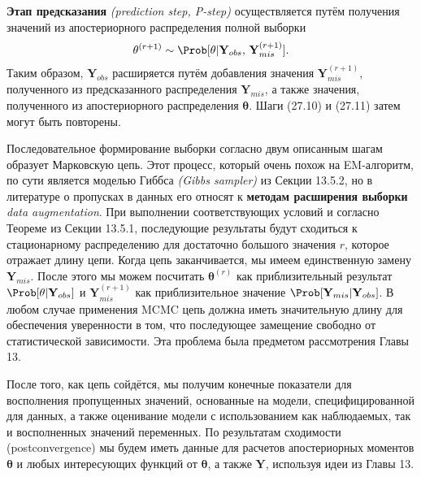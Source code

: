 {\bf Этап предсказания} \emph{(prediction step, P-step)} осуществляется путём получения значений из апостериорного распределения полной выборки
\begin{equation}
\mathbf{\theta}^{(r+1)} \sim \Prob[\mathbf{\theta}|\mathbf{Y}_{obs}, \, \mathbf{Y}_{mis}^{(r+1)}].
\end{equation}
Таким образом, $\mathbf{Y}_{obs}$ расширяется путём добавления значения $\mathbf{Y}_{mis}^{(r+1)}$, полученного из предсказанного распределения $\mathbf{Y}_{mis}$, а также значения, полученного из апостериорного распределения $\mathbf{\theta}$. Шаги (27.10) и (27.11) затем могут быть повторены.

Последовательное формирование выборки согласно двум описанным шагам образует Марковскую цепь. Этот процесс, который очень похож на EM-алгоритм, по сути является моделью Гиббса \emph{(Gibbs sampler)} из Секции 13.5.2, но в литературе о пропусках в данных его относят к {\bf методам расширения выборки} \emph{data augmentation}. При выполнении соответствующих условий и согласно Теореме из Секции 13.5.1, последующие результаты будут сходиться к стационарному распределению для достаточно большого значения $r$, которое отражает длину цепи. Когда цепь заканчивается, мы имеем единственную замену $\mathbf{Y}_{mis}$. После этого мы можем посчитать $\mathbf{\theta}^{(r)}$ как приблизительный результат $\Prob[\mathbf{\theta}|\mathbf{Y}_{obs}]$ и $\mathbf{Y}_{mis}^{(r+1)}$ как приблизительное значение $\Prob[\mathbf{Y}_{mis}|\mathbf{Y}_{obs}]$. В любом случае применения MCMC цепь должна иметь значительную длину для обеспечения уверенности в том, что последующее замещение свободно от статистической зависимости. Эта проблема была предметом рассмотрения Главы 13.

После того, как цепь сойдётся, мы получим конечные показатели для восполнения пропущенных значений, основанные на модели, специфицированной для данных, а также оценивание модели с использованием как наблюдаемых, так и восполненных значений переменных. По результатам сходимости (postconvergence) мы будем иметь данные для расчетов апостериорных моментов $\mathbf{\theta}$ и любых интересующих функций от $\mathbf{\theta}$, а также $\mathbf{Y}$, используя идеи из Главы 13.

